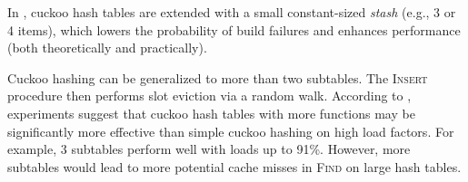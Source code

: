 In \cite{kirsch2009more}, cuckoo hash tables are extended with a small
constant-sized \emph{stash} (e.g., 3 or 4 items), which lowers the probability
of build failures and enhances performance (both theoretically and practically).

Cuckoo hashing can be generalized to more than two subtables.
The \textsc{Insert} procedure then performs slot eviction via a random walk.
According to \cite{open-questions-cuckoo}, experiments suggest that cuckoo
hash tables with more functions may be significantly more effective than simple
cuckoo hashing on high load factors. For example, 3 subtables perform well
with loads up to 91\%. However, more subtables would lead to more potential
cache misses in \textsc{Find} on large hash tables.
